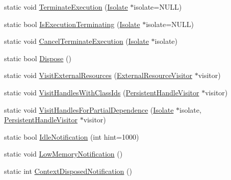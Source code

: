 \begin{DoxyCompactItemize}
static void \hyperlink{classv8_1_1_v8_a81a47f6709c7d376a448d6315398aeb8}{Terminate\+Execution} (\hyperlink{classv8_1_1_isolate}{Isolate} $\ast$isolate=N\+U\+L\+L)
\item 
static bool \hyperlink{classv8_1_1_v8_a8e0ad59109f022ecca7121e2ea990997}{Is\+Execution\+Terminating} (\hyperlink{classv8_1_1_isolate}{Isolate} $\ast$isolate=N\+U\+L\+L)
\item 
static void \hyperlink{classv8_1_1_v8_ac2fb064870a2ca3bf6f7933c3dff6d85}{Cancel\+Terminate\+Execution} (\hyperlink{classv8_1_1_isolate}{Isolate} $\ast$isolate)
\item 
static bool \hyperlink{classv8_1_1_v8_a566450d632c0a63770682b9da3cae08d}{Dispose} ()
\item 
static void \hyperlink{classv8_1_1_v8_a1fd57739642c8304dc8a34dd283da840}{Visit\+External\+Resources} (\hyperlink{classv8_1_1_external_resource_visitor}{External\+Resource\+Visitor} $\ast$visitor)
\item 
static void \hyperlink{classv8_1_1_v8_a5bf6f26e51cd3e9d71a662fe7efa5206}{Visit\+Handles\+With\+Class\+Ids} (\hyperlink{classv8_1_1_persistent_handle_visitor}{Persistent\+Handle\+Visitor} $\ast$visitor)
\item 
static void \hyperlink{classv8_1_1_v8_ab2e242c45c73a0cee755e55acec71bd5}{Visit\+Handles\+For\+Partial\+Dependence} (\hyperlink{classv8_1_1_isolate}{Isolate} $\ast$isolate, \hyperlink{classv8_1_1_persistent_handle_visitor}{Persistent\+Handle\+Visitor} $\ast$visitor)
\item 
static bool \hyperlink{classv8_1_1_v8_abcafb07ace99c980e42662299eb9eb1d}{Idle\+Notification} (int hint=1000)
\item 
static void \hyperlink{classv8_1_1_v8_a7df118b9667d04903f8e9fb7452fd1ac}{Low\+Memory\+Notification} ()
\item 
static int \hyperlink{classv8_1_1_v8_a06126bd2345c086a376f934ec1fbcce6}{Context\+Disposed\+Notification} ()
\end{DoxyCompactItemize}
